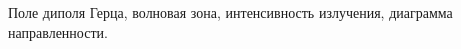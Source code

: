 \documentclass[__main__.tex]{subfiles}
\begin{document}
Поле диполя Герца, волновая зона, интенсивность излучения, диаграмма направленности.\\ 

\end{document}
